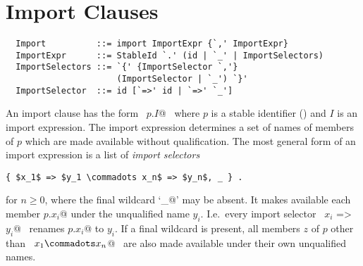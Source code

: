 
\section{Import Clauses}
\label{sec:import}

\syntax\begin{lstlisting}
  Import          ::= import ImportExpr {`,' ImportExpr}
  ImportExpr      ::= StableId `.' (id | `_' | ImportSelectors)
  ImportSelectors ::= `{' {ImportSelector `,'} 
                      (ImportSelector | `_') `}'
  ImportSelector  ::= id [`=>' id | `=>' `_']
\end{lstlisting}

An import clause has the form ~\lstinline@import $p$.$I$@~ where $p$ is a stable
identifier () and $I$ is an import expression.
The import expression determines a set of names of members of $p$
which are made available without qualification. 
The most general form of an import expression is a list of {\em import
selectors}
\begin{lstlisting}
{ $x_1$ => $y_1 \commadots x_n$ => $y_n$, _ } .
\end{lstlisting}
for $n \geq 0$, where the final wildcard `\lstinline@_@' may be absent.  It
makes available each member \lstinline@$p$.$x_i$@ under the unqualified name
$y_i$. I.e.\ every import selector ~\lstinline@$x_i$ => $y_i$@~ renames
\lstinline@$p$.$x_i$@ to
$y_i$.  If a final wildcard is present, all members $z$ of
$p$ other than ~\lstinline@$x_1 \commadots x_n$@~ are also made available
under their own unqualified names.

